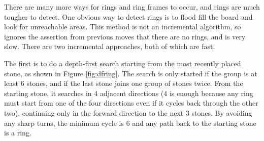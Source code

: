 There are many more ways for rings and ring frames to occur, and rings are much tougher to detect. One obvious way to detect rings is to flood fill the board and look for unreachable areas. This method is not an incremental algorithm, so ignores the assertion from previous moves that there are no rings, and is very slow. There are two incremental approaches, both of which are fast.

The first is to do a depth-first search starting from the most recently placed stone, as shown in Figure \ref{fig:dfring}. The search is only started if the group is at least 6 stones, and if the last stone joins one group of stones twice. From the starting stone, it searches in 4 adjacent directions (4 is enough because any ring must start from one of the four directions even if it cycles back through the other two), continuing only in the forward direction to the next 3 stones. By avoiding any sharp turns, the minimum cycle is 6 and any path back to the starting stone is a ring.

